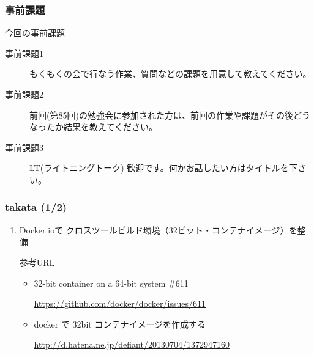 \documentclass[cjk,dvipdfmx,10pt,compress,%
hyperref={bookmarks=true,bookmarksnumbered=true,bookmarksopen=false,%
colorlinks=false,%
pdftitle={第 87 回 関西 Debian 勉強会},%
pdfauthor={倉敷・のがた・佐々木・かわだ・八津尾},%
pdfsubject={資料},%
}]{beamer}
\begin{document}
\begin{frame}[fragile]
  \frametitle{事前課題}
  \begin{block}{今回の事前課題}
    \begin{description}
    \item[事前課題1]
      もくもくの会で行なう作業、質問などの課題を用意して教えてください。
    \item[事前課題2]
      前回(第85回)の勉強会に参加された方は、前回の作業や課題がその後どう
      なったか結果を教えてください。
    \item[事前課題3]
      LT(ライトニングトーク) 歓迎です。何かお話したい方はタイトルを下さい。
    \end{description}
  \end{block}
\end{frame}


\begin{frame}
  \frametitle{ takata (1/2)}
  \begin{enumerate}
  \item Docker.ioで クロスツールビルド環境（32ビット・コンテナイメージ）を整備

    参考URL
    \begin{itemize}
    \item 32-bit container on a 64-bit system \#611

      \url{https://github.com/docker/docker/issues/611}
    \item docker で 32bit コンテナイメージを作成する

      \url{http://d.hatena.ne.jp/defiant/20130704/1372947160}
    \end{itemize}
  \end{enumerate}
\end{frame}
\end{document}
